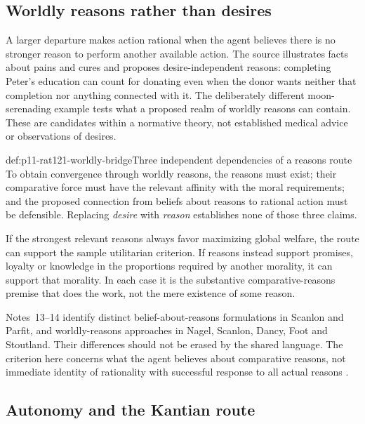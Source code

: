 \subsection{Worldly reasons rather than desires}

A larger departure makes action rational when the agent believes
there is no stronger reason to perform another available action.
The source illustrates facts about pains and cures and proposes
desire-independent reasons: completing Peter's education can count
for donating even when the donor wants neither that completion nor
anything connected with it. The deliberately different moon-serenading
example tests what a proposed realm of worldly reasons can contain.
These are candidates within a normative theory, not established
medical advice or observations of desires.

\begin{hbwarning}{def:p11-rat121-worldly-bridge}{Three independent dependencies of a reasons route}
To obtain convergence through worldly reasons, the reasons must
exist; their comparative force must have the relevant affinity
with the moral requirements; and the proposed connection from
beliefs about reasons to rational action must be defensible.
Replacing \emph{desire} with \emph{reason} establishes none
of those three claims.

If the strongest relevant reasons always favor maximizing global
welfare, the route can support the sample utilitarian criterion.
If reasons instead support promises, loyalty or knowledge in the
proportions required by another morality, it can support that
morality. In each case it is the substantive comparative-reasons
premise that does the work, not the mere existence of some reason.
\end{hbwarning}

Notes~13--14 identify distinct belief-about-reasons formulations in
Scanlon and Parfit, and worldly-reasons approaches in Nagel,
Scanlon, Dancy, Foot and Stoutland. Their differences should not
be erased by the shared language. The criterion here concerns
what the agent believes about comparative reasons, not immediate
identity of rationality with successful response to all actual reasons
\parencite[p.~686 and nn.~13--14]{FehigeWessels2021Morality}.

\subsection{Autonomy and the Kantian route}

